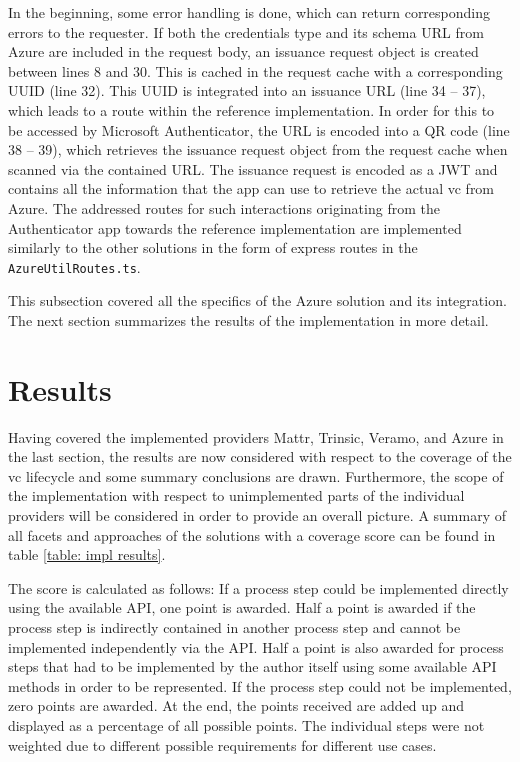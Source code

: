         In the beginning, some error handling is done, which can return corresponding errors to the requester. If both the credentials type and its schema URL from Azure are included in the request body, an issuance request object is created between lines 8 and 30. This is cached in the request cache with a corresponding UUID (line 32). This UUID is integrated into an issuance URL (line 34 – 37), which leads to a route within the reference implementation. In order for this to be accessed by Microsoft Authenticator, the URL is encoded into a QR code (line 38 – 39), which retrieves the issuance request object from the request cache when scanned via the contained URL. The issuance request is encoded as a JWT and contains all the information that the app can use to retrieve the actual \ac{vc} from Azure. The addressed routes for such interactions originating from the Authenticator app towards the reference implementation are implemented similarly to the other solutions in the form of express routes in the \texttt{AzureUtilRoutes.ts}.
        
        This subsection covered all the specifics of the Azure solution and its integration. The next section summarizes the results of the implementation in more detail.
        \vfill
    
    \section{Results} %
    
    Having covered the implemented providers Mattr, Trinsic, Veramo, and Azure in the last section, the results are now considered with respect to the coverage of the \ac{vc} lifecycle and some summary conclusions are drawn. Furthermore, the scope of the implementation with respect to unimplemented parts of the individual providers will be considered in order to provide an overall picture. A summary of all facets and approaches of the solutions with a coverage score can be found in table \ref{table: impl results}.
     
    The score is calculated as follows: If a process step could be implemented directly using the available API, one point is awarded. Half a point is awarded if the process step is indirectly contained in another process step and cannot be implemented independently via the API. Half a point is also awarded for process steps that had to be implemented by the author itself using some available API methods in order to be represented. If the process step could not be implemented, zero points are awarded. At the end, the points received are added up and displayed as a percentage of all possible points. The individual steps were not weighted due to different possible requirements for different use cases.
    

